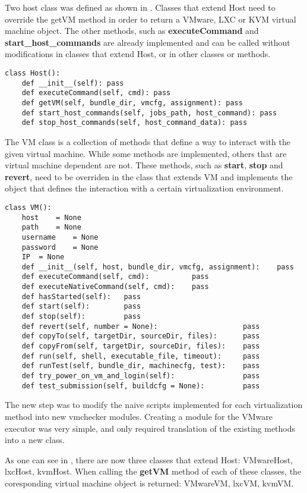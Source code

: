 Two host class was defined as shown in .
Classes that extend Host need to override the getVM method in order to return a
VMware, LXC or KVM virtual machine object. The other methods, such as \textbf{executeCommand}
and \textbf{start_host_commands} are already implemented and can be called
without modifications in classes that extend Host, or in other classes or methods.

\lstset{caption=Generic Host Implementation, language=python, label=lst:generic-host}
\begin{lstlisting}
class Host():
    def __init__(self): pass
    def executeCommand(self, cmd): pass
    def getVM(self, bundle_dir, vmcfg, assignment): pass
    def start_host_commands(self, jobs_path, host_command): pass
    def stop_host_commands(self, host_command_data): pass
\end{lstlisting}


The VM class is a collection of methods that define a way to interact with the
given virtual machine. While some methods are implemented, others that are
virtual machine dependent are not. These methods, such as \textbf{start}, 
\textbf{stop} and \textbf{revert}, need to be overriden in the 
class that extends VM and implements the object that defines the interaction
with a certain virtualization environment.

\lstset{caption=Generic VM Implementation, language=python, label=lst:generic-vm}
\begin{lstlisting}
class VM():
    host 	= None
    path 	= None
    username	= None
    password	= None
    IP	= None
    def __init__(self, host, bundle_dir, vmcfg, assignment):    pass
    def executeCommand(self, cmd):          pass
    def executeNativeCommand(self, cmd):    pass
    def hasStarted(self):   pass
    def start(self):        pass
    def stop(self):         pass
    def revert(self, number = None):                    pass
    def copyTo(self, targetDir, sourceDir, files):      pass
    def copyFrom(self, targetDir, sourceDir, files):    pass
    def run(self, shell, executable_file, timeout):     pass
    def runTest(self, bundle_dir, machinecfg, test):    pass
    def try_power_on_vm_and_login(self):                pass
    def test_submission(self, buildcfg = None):         pass
\end{lstlisting}


The new step was to modify the naive scripts implemented for each virtualization
method into new vmchecker modules. Creating a module for the VMware executor
was very simple, and only required translation of the existing methods into a new
class.

As one can see in , there are now three
classes that extend Host: VMwareHost, lxcHost, kvmHost. When calling the
{\bf getVM} method of each of these classes, the coresponding virtual
machine object is returned: VMwareVM, lxcVM, kvmVM.

\begin{center}
\end{center}



